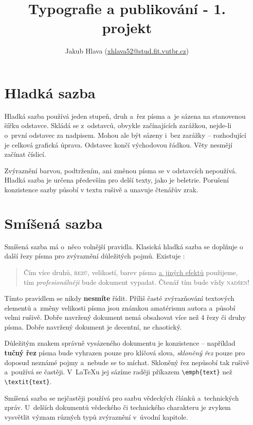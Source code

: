\documentclass[a4paper, 10pt, twocolumn]{article}
\title{Typografie a publikování - 1. projekt}
\author{Jakub Hlava (\href{mailto:xhlava52@stud.fit.vutbr.cz}{xhlava52@stud.fit.vutbr.cz}{})}
\date{}
\begin{document}
\maketitle

\section{Hladká sazba}
\par
Hladká sazba používá jeden stupeň, druh a~řez písma a~je sázena na stanovenou šířku odstavce. Skládá se z~odstavců, obvykle začínajících zarážkou, nejde-li o~první odstavec za nadpisem. Mohou ale být sázeny i~bez zarážky -- rozhodující je celková grafická úprava. Odstavec končí východovou řádkou. Věty nesmějí začínat číslicí.
\par
Zvýraznění barvou, podtržením, ani změnou písma se v odstavcích nepoužívá. Hladká sazba je určena především pro delší texty, jako je beletrie. Porušení konzistence sazby působí v textu rušivě a unavuje čtenářův zrak.
\section{Smíšená sazba}
\par
Smíšená sazba má o~něco volnější pravidla. Klasická hladká sazba se doplňuje o další řezy písma pro zvýraznění důležitých pojmů. Existuje :
\par
\begin{quotation}
{\large {} \selectfont \textup{Čím více druhů}}, \textsc{řezů}, {\tiny velikostí}, barev písma \underline{a~jiných efektů} použijeme, tím {\large \emph{profesionálněji}} bude dokument vypadat. Čtenář tím bude vždy {\textsc{nadšen}}!
\end{quotation}
\par
{\small Tímto} pravidlem se nikdy \textbf{nesmíte} řídit. Příliš časté {\large zvýrazňování} textových elementů a~změny velikosti {\huge písma} jsou známkou amatérismu autora a~působí {\Huge velmi} rušivě. Dobře navržený dokument nemá obsahovat více než 4 řezy či druhy písma. Dobře navržený dokument je decentní, ne chaotický.
\par
Důležitým znakem správně vysázeného dokumentu je konzistence -- například \textbf{tučný řez} písma bude vyhrazen pouze pro klíčová slova, \textit{skloněný řez} pouze pro doposud neznámé pojmy a~nebude se to míchat. Skloněný řez nepůsobí tak rušivě a~používá se častěji. V~\LaTeX u jej sázíme raději příkazem \verb|\emph{text}| než \verb|\textit{text}|.
\par
Smíšená sazba se nejčastěji používá pro sazbu vědeckých článků a~technických zpráv. U~delších dokumentů vědeckého či technického charakteru je zvykem vysvětlit význam různých typů zvýraznění v~úvodní kapitole.
\end{document}
